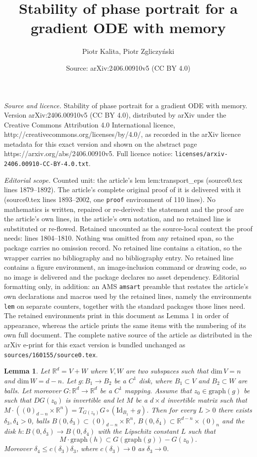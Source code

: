 \documentclass[10pt,a4paper]{amsart}
\title{Stability of phase portrait for a gradient ODE with memory}
\author{Piotr Kalita, Piotr Zgliczyński}
\date{Source: arXiv:2406.00910v5 (CC BY 4.0)}
\newtheorem{lem}{Lemma}
\def\R{\mathbb{R}}
\begin{document}
\maketitle

\noindent\emph{Source and licence.} Stability of phase portrait for a gradient ODE with memory. Version arXiv:2406.00910v5 (CC BY 4.0), distributed by arXiv under the Creative Commons Attribution 4.0 International licence, http://creativecommons.org/licenses/by/4.0/, as recorded in the arXiv licence metadata for this exact version and shown on the abstract page https://arxiv.org/abs/2406.00910v5. Full licence notice: \texttt{licenses/arxiv-2406.00910-CC-BY-4.0.txt}.\par\smallskip

\noindent\textit{Editorial scope.} Counted unit: the article's lem lem:transport\_eps (source0.tex lines 1879--1892). The article's complete original proof of it is delivered with it (source0.tex lines 1893--2002, one \texttt{proof} environment of 110 lines). No mathematics is written, repaired or re-derived: the statement and the proof are the article's own lines, in the article's own notation, and no retained line is substituted or re-flowed.  Retained uncounted as the source-local context the proof needs: lines 1804--1810.  Nothing was omitted from any retained span, so the package carries no omission record.  No retained line contains a citation, so the wrapper carries no bibliography and no bibliography entry.  No retained line contains a figure environment, an image-inclusion command or drawing code, so no image is delivered and the package declares no asset dependency.  Editorial formatting only, in addition: an AMS \texttt{amsart} preamble that restates the article's own declarations and macros used by the retained lines, namely the environments \texttt{lem} on separate counters, together with the standard packages those lines need.  The retained environments print in this document as Lemma 1 in order of appearance, whereas the article prints the same items with the numbering of its own full document.  The complete native source of the article as distributed in the arXiv e-print for this exact version is bundled unchanged as \texttt{sources/160155/source0.tex}.
	 		 	\begin{lem}\label{lem:transport_disks} Let $\R^d=V+W$ where $V,W$ are two subspaces such that $\text{dim}\, V = n$ and $\text{dim}\, W = d-n$.  Let $g:B_1\to B_2$ be a $C^1$  disk, where $B_1\subset V$ and $B_2 \subset W$ are balls.  
	 		Let moreover $G:\R^d\to \R^d$ be a $C^1$ mapping.  Assume that $z_0\in \text{graph}(g)$ be such that $DG(z_0)$ is invertible and let $M$ be a $d\times d$  invertible matrix such that $M\cdot((0)_{d-n}\times \R^n) = T_{G(z_0)}G\circ (\textrm{Id}_{B_1}+g)$. Then for every $L>0$ there exists  $\delta_3, \delta_4>0$, balls $B(0,\delta_3)\subset  (0)_{d-n} \times \R^n$, $B(0,\delta_4)\subset \R^{d-n} \times (0)_n$ and the  disk $h:B(0,\delta_3)\to B(0,\delta_4)$ with the Lipschitz constant  $L$ such that 
	 		$$
	 		M \cdot \text{graph}(h) \subset G(\text{graph}(g))-G(z_0).
	 		$$
	 		Moreover $\delta_4\leq c(\delta_3)\delta_3$, where $c(\delta_3)\to 0$ as $\delta_3\to 0$. 
	 	\end{lem}
\end{document}
